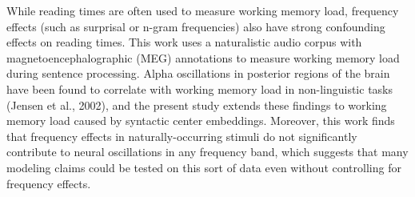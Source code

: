 While reading times are often used to measure working memory load, frequency effects (such as surprisal or n-gram frequencies) also have strong confounding effects on reading times. This work uses a naturalistic audio corpus with magnetoencephalographic (MEG) annotations to measure working memory load during sentence processing. Alpha oscillations in posterior regions of the brain have been found to correlate with working memory load in non-linguistic tasks (Jensen et al., 2002), and the present study extends these findings to working memory load caused by syntactic center embeddings. Moreover, this work finds that frequency effects in naturally-occurring stimuli do not significantly contribute to neural oscillations in any frequency band, which suggests that many modeling claims could be tested on this sort of data even without controlling for frequency effects.
